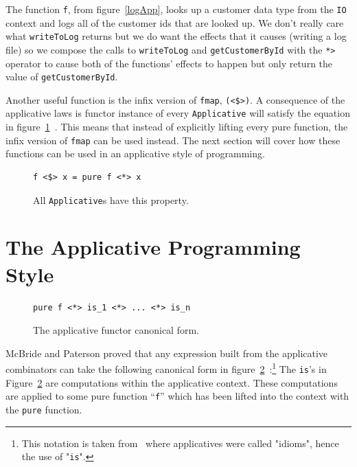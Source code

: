 The function \texttt{f}, from figure~\ref{logApp}, looks up a customer data type from the \texttt{IO} context and logs all of the customer ids that are looked up. We don't really care what \texttt{writeToLog} returns but we do want the effects that it causes (writing a log file) so we compose the calls to \texttt{writeToLog} and \texttt{getCustomerById} with the \texttt{*>} operator to cause both of the functions' effects to happen but only return the value of \texttt{getCustomerById}.

Another useful function is the infix version of \texttt{fmap}, \texttt{(<\$>)}. A consequence of the applicative laws is functor instance of every \texttt{Applicative} will satisfy the equation in figure~\ref{fmapLaw}~\citep{control.applicative}. This means that instead of explicitly lifting every pure function, the infix version of \texttt{fmap} can be used instead. The next section will cover how these functions can be used in an applicative style of programming.

\begin{figure}[t]
\begin{lstlisting}
f <$> x = pure f <*> x
\end{lstlisting}
\caption{All \texttt{Applicative}s have this property.}
\label{fmapLaw}
\end{figure}

 


\section{The Applicative Programming Style}
\label{sec:appProgStyle}

\begin{figure}[t]
\begin{lstlisting}
pure f <*> is_1 <*> ... <*> is_n
\end{lstlisting}
\caption{The applicative functor canonical form.}
\label{canonForm}
\end{figure}

McBride and Paterson proved that any expression built from the applicative combinators can take the following canonical form in figure~\ref{canonForm}~\citep{mcbrideIdioms}:\footnote{This notation is taken from~\citep{mcbrideIdioms} where applicatives were called "idioms", hence the use of "\texttt{is}".} The \texttt{is}'s in Figure~\ref{canonForm} are computations within the applicative context. These computations are applied to some pure function ``\texttt{f}'' which has been lifted into the context with the \texttt{pure} function. 

